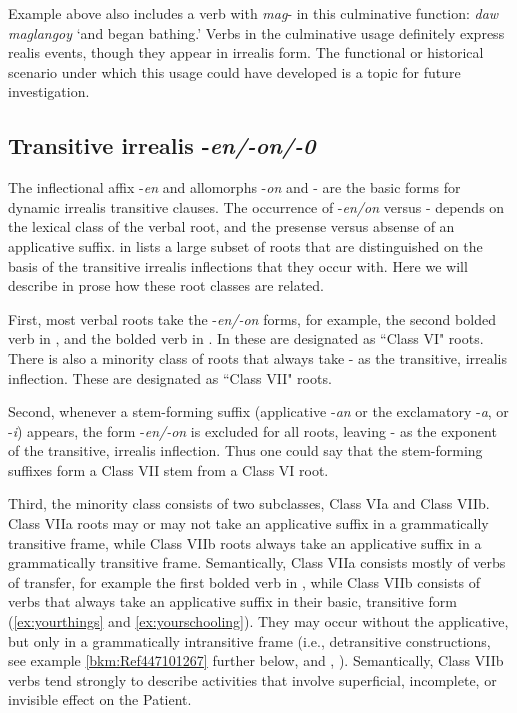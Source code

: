 Example  above also includes a verb with \textit{mag}{}- in this culminative function: \textit{daw maglangoy} ‘and began bathing.’ Verbs in the culminative usage definitely express realis events, though they appear in irrealis form. The functional or historical scenario under which this usage could have developed is a topic for future investigation.

\subsection{Transitive irrealis -\textit{en/-on/-0}}
\label{bkm:Ref448124627} \label{sec:transitiveirrealis}

The inflectional affix -\textit{en} and allomorphs -\textit{on} and \textit{\emptyset}- are the basic forms for dynamic irrealis transitive clauses. The occurrence of -\textit{en/on} versus \textit{\emptyset}- depends on the lexical class of the verbal root, and the presense versus absense of an applicative suffix.  in  lists a large subset of roots that are distinguished on the basis of the transitive irrealis inflections that they occur with. Here we will describe in prose how these root classes are related.

First, most verbal roots take the -\textit{en/-on} forms, for example, the second bolded verb in , and the bolded verb in . In  these are designated as  ``Class VI" roots. There is also a minority class of roots that always take \emptyset{}- as the transitive, irrealis inflection. These are designated as ``Class VII" roots.

Second, whenever a stem-forming suffix (applicative -\textit{an} or the exclamatory -\textit{a}, or -\textit{i}) appears, the form -\textit{en/-on} is excluded for all roots, leaving \emptyset{}- as the exponent of the transitive, irrealis inflection. Thus one could say that the stem-forming suffixes form a Class VII stem from a Class VI root.

Third, the minority class consists of two subclasses, Class VIa and Class VIIb. Class VIIa roots may or may not take an applicative suffix in a grammatically transitive frame, while Class VIIb roots always take an applicative suffix in a grammatically transitive frame. Semantically, Class VIIa consists mostly of verbs of transfer, for example the first bolded verb in , while Class VIIb consists of verbs that always take an applicative suffix in their basic, transitive form (\ref{ex:yourthings} and \ref{ex:yourschooling}). They may occur without the applicative, but only in a grammatically intransitive frame (i.e., detransitive constructions, see example \ref{bkm:Ref447101267} further below, and , ). Semantically, Class VIIb verbs tend strongly to describe activities that involve superficial, incomplete, or invisible effect on the Patient.    

